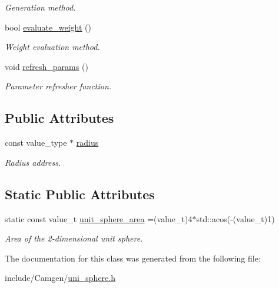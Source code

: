 \begin{DoxyCompactItemize}
\begin{DoxyCompactList}\small\item\em Generation method. \end{DoxyCompactList}\item 
\hypertarget{a00551_a33d815c967c20539794149c98ff6d5b3}{bool \hyperlink{a00551_a33d815c967c20539794149c98ff6d5b3}{evaluate\-\_\-weight} ()}\label{a00551_a33d815c967c20539794149c98ff6d5b3}

\begin{DoxyCompactList}\small\item\em Weight evaluation method. \end{DoxyCompactList}\item 
\hypertarget{a00551_a619daae5a8feed52d5faaedfcb585d8e}{void \hyperlink{a00551_a619daae5a8feed52d5faaedfcb585d8e}{refresh\-\_\-params} ()}\label{a00551_a619daae5a8feed52d5faaedfcb585d8e}

\begin{DoxyCompactList}\small\item\em Parameter refresher function. \end{DoxyCompactList}\end{DoxyCompactItemize}
\subsection*{Public Attributes}
\begin{DoxyCompactItemize}
\item 
\hypertarget{a00551_ae47846d4662f49649cdfe7dd38ca876e}{const value\-\_\-type $\ast$ \hyperlink{a00551_ae47846d4662f49649cdfe7dd38ca876e}{radius}}\label{a00551_ae47846d4662f49649cdfe7dd38ca876e}

\begin{DoxyCompactList}\small\item\em Radius address. \end{DoxyCompactList}\end{DoxyCompactItemize}
\subsection*{Static Public Attributes}
\begin{DoxyCompactItemize}
\item 
\hypertarget{a00551_a21886a7c7da83aef5c4b34fc552d9168}{static const value\-\_\-t \hyperlink{a00551_a21886a7c7da83aef5c4b34fc552d9168}{unit\-\_\-sphere\-\_\-area} =(value\-\_\-t)4$\ast$std\-::acos(-\/(value\-\_\-t)1)}\label{a00551_a21886a7c7da83aef5c4b34fc552d9168}

\begin{DoxyCompactList}\small\item\em Area of the 2-\/dimensional unit sphere. \end{DoxyCompactList}\end{DoxyCompactItemize}


The documentation for this class was generated from the following file\-:\begin{DoxyCompactItemize}
\item 
include/\-Camgen/\hyperlink{a00797}{uni\-\_\-sphere.\-h}\end{DoxyCompactItemize}
